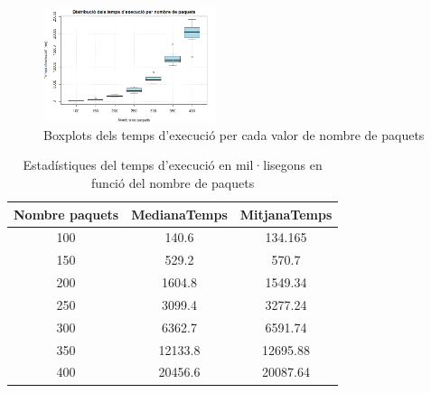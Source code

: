 \documentclass[a4paper]{article}
\begin{document}
	\begin{figure}[H]
		\centering
		\includegraphics[width=0.45\textwidth]{images/exp4b_boxplots.png}
		\caption{Boxplots dels temps d'execució per cada valor de nombre de paquets}
		\label{fig:exp4b_boxplots}
	\end{figure}
	
	\begin{table}[H]
		\centering
		\begin{tabular}{|c|c|c|}
			\hline
			\textbf{Nombre paquets} & \textbf{MedianaTemps} & \textbf{MitjanaTemps} \\
			\hline
			100 & 140.6 & 134.165\\
			\hline
			150& 529.2 & 570.7\\
			\hline
			200& 1604.8 & 1549.34\\
			\hline
			250& 3099.4 & 3277.24\\
			\hline
			300& 6362.7 & 6591.74\\
			\hline
			350& 12133.8 & 12695.88\\
			\hline
			400& 20456.6 & 20087.64\\
			\hline
		\end{tabular}
		\caption{Estadístiques del temps d'execució en mil·lisegons en funció del nombre de paquets}
		\label{tab:exp4b_temps}
	\end{table}
\end{document}
